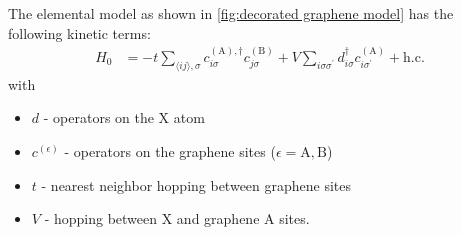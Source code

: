 \documentclass[../main.tex]{subfiles}
\begin{document}
The elemental model as shown in \cref{fig:decorated graphene model} has the following kinetic terms:
\begin{align}
	H_0 &= -t \sum_{\langle ij \rangle, \sigma}
	c_{i \sigma}^{(\mathrm{A}), \dagger} c_{j \sigma}^{(\mathrm{B})}
	+ V \sum_{i \sigma \sigma^{\prime}}
	d_{i \sigma}^{\dagger} c_{i \sigma^{\prime}}^{(\mathrm{A})} + \mathrm{h.c.}
	\label{eq:EG-X model Hamiltonian non-interacting}
\end{align}
with
\begin{itemize}
	\item \(d\) - operators on the X atom
	\item \(c^{(\epsilon)}\) - operators on the graphene sites (\(\epsilon = \mathrm{A}, \mathrm{B}\))
	\item \(t\) - nearest neighbor hopping between graphene sites
	\item \(V\) - hopping between \(\mathrm{X}\) and graphene \(\mathrm{A}\) sites.
\end{itemize}
\end{document}
